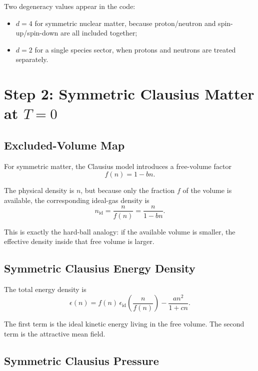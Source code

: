 \documentclass[11pt]{article}
\begin{document}
Two degeneracy values appear in the code:
\begin{itemize}
\item $d=4$ for symmetric nuclear matter, because proton/neutron and spin-up/spin-down
are all included together;
\item $d=2$ for a single species sector, when protons and neutrons are treated
separately.
\end{itemize}

\section{Step 2: Symmetric Clausius Matter at \texorpdfstring{$T=0$}{T=0}}

\subsection{Excluded-Volume Map}

For symmetric matter, the Clausius model introduces a free-volume factor
\begin{equation}
f(n)=1-bn.
\end{equation}

The physical density is $n$, but because only the fraction $f$ of the volume
is available, the corresponding ideal-gas density is
\begin{equation}
n_{\mathrm{id}}=\frac{n}{f(n)}=\frac{n}{1-bn}.
\end{equation}

This is exactly the hard-ball analogy: if the available volume is smaller, the
effective density inside that free volume is larger.

\subsection{Symmetric Clausius Energy Density}

The total energy density is
\begin{equation}
\epsilon(n)
=
f(n)\,\epsilon_{\mathrm{id}}\!\left(\frac{n}{f(n)}\right)
-\frac{a n^2}{1+cn}.
\end{equation}

The first term is the ideal kinetic energy living in the free volume. The
second term is the attractive mean field.

\subsection{Symmetric Clausius Pressure}
\end{document}
